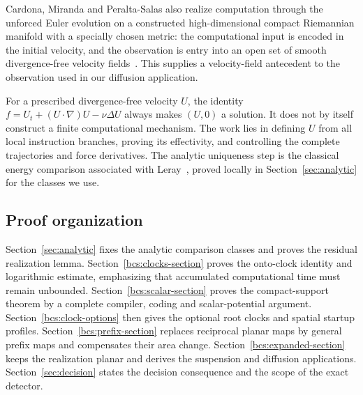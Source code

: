 \documentclass[11pt]{article}
\begin{document}
Cardona, Miranda and Peralta-Salas also realize computation through the unforced Euler evolution on a constructed high-dimensional compact Riemannian manifold with a specially chosen metric: the computational input is encoded in the initial velocity, and the observation is entry into an open set of smooth divergence-free velocity fields~\cite[arXiv v1, Theorem~1.1, Remark~1.2 and Definition~5.1]{CardonaMirandaPeraltaSalas2022}. This supplies a velocity-field antecedent to the observation used in our diffusion application.

For a prescribed divergence-free velocity $U$, the identity
$f=U_t+(U\cdot\nabla)U-\nu\Delta U$ always makes $(U,0)$ a solution. It does not by itself construct a finite computational mechanism. The work lies in defining $U$ from all local instruction branches, proving its effectivity, and controlling the complete trajectories and force derivatives. The analytic uniqueness step is the classical energy comparison associated with Leray~\cite[Section~18]{Leray1934}, proved locally in Section~\ref{sec:analytic} for the classes we use.

\subsection{Proof organization}
Section~\ref{sec:analytic} fixes the analytic comparison classes and proves the residual realization lemma. Section~\ref{bcs:clocks-section} proves the onto-clock identity and logarithmic estimate, emphasizing that accumulated computational time must remain unbounded. Section~\ref{bcs:scalar-section} proves the compact-support theorem by a complete compiler, coding and scalar-potential argument. Section~\ref{bcs:clock-options} then gives the optional root clocks and spatial startup profiles. Section~\ref{bcs:prefix-section} replaces reciprocal planar maps by general prefix maps and compensates their area change. Section~\ref{bcs:expanded-section} keeps the realization planar and derives the suspension and diffusion applications. Section~\ref{sec:decision} states the decision consequence and the scope of the exact detector.







\end{document}
